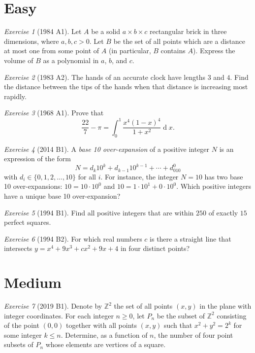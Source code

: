 \documentclass{article}
\theoremstyle{definition}
\theoremstyle{remark}
\newtheorem{exercise}{Exercise}
\newcommand{\ZZ}{\mathbb{Z}}
\renewcommand{\d}[1]{\ensuremath{\operatorname{d}\!{#1}}}
\begin{document}
\section{Easy}

\begin{exercise}[1984 A1]
Let $A$ be a solid $a\times b\times c $ rectangular brick in three dimensions, where $a,b,c>0$. Let $B$ be the set of all points which are a distance at most one from some point of $A$ (in particular, $B$ contains $A$). Express the volume of $B$ as a polynomial in $a$, $b$, and $c$.
\end{exercise}

\begin{exercise}[1983 A2]
    The hands of an accurate clock have lengths $3$ and $4$. Find the distance between the tips of the hands when that distance is increasing most rapidly.
\end{exercise}

\begin{exercise}[1968 A1]
    Prove that
    \[\frac{22}{7}-\pi = \int_0^1\frac{x^4(1-x)^4}{1+x^2}\d x.\]
\end{exercise}

\begin{exercise}[2014 B1]
    A {\it base 10 over-expansion} of a positive integer \(N\) is an expression of the form
    \[N = d_k10^k+d_{k-1}10^{k-1}+\cdots+d_010^0\]
    with \(d_i\in\{0,1,2,\ldots,10\}\) for all \(i\).
    For instance, the integer \(N=10\) has two base 10 over-expansions: \(10=10\cdot 10^0\) and \(10=1\cdot 10^1+0\cdot 10^0\).
    Which positive integers have a unique base 10 over-expansion?
\end{exercise}

\begin{exercise}[1994 B1]
Find all positive integers that are within $250$ of exactly $15$ perfect squares.
\end{exercise}

\begin{exercise}[1994 B2]
For which real numbers $c$ is there a straight line that intersects $y=x^4+9x^3+cx^2+9x+4$ in four distinct points?
\end{exercise}

\section{Medium}

\begin{exercise}[2019 B1]
    Denote by \(\ZZ^2\) the set of all points \((x,y)\) in the plane with integer coordinates.
    For each integer \(n\geq 0\), let \(P_n\) be the subset of \(\ZZ^2\) consisting of the point \((0,0)\) together with all points \((x,y)\) such that \(x^2+y^2=2^k\) for some integer \(k\leq n\).
    Determine, as a function of \(n\), the number of four point subsets of \(P_n\) whose elements are vertices of a square.
\end{exercise}
\end{document}
